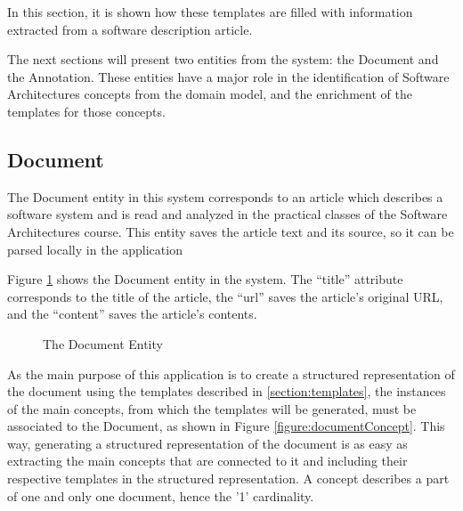 In this section, it is shown how these templates are filled with information extracted from a software description article.

The next sections will present two entities from the system: the Document and the Annotation. These entities have a major role in the identification of Software Architectures concepts from the domain model, and the enrichment of the templates for those concepts.

\subsection{Document}
\label{section:document}

The Document entity in this system corresponds to an article which describes a software system and is read and analyzed in the practical classes of the Software Architectures course. This entity saves the article text and its source, so it can be parsed locally in the application

Figure \ref{figure:documentEntity} shows the Document entity in the system. The ``title'' attribute corresponds to the title of the article, the ``url'' saves the article's original URL, and the ``content'' saves the article's contents.

\begin{figure}[h]
\centering
\renewcommand {\umltextcolor}{black}
\renewcommand {\umlfillcolor}{none}
\renewcommand {\umldrawcolor}{black}

\caption{The Document Entity}
\label{figure:documentEntity}
\end{figure}

As the main purpose of this application is to create a structured representation of the document using the templates described in \ref{section:templates}, the instances of the main concepts, from which the templates will be generated, must be associated to the Document, as shown in Figure \ref{figure:documentConcept}. This way, generating a structured representation of the document is as easy as extracting the main concepts that are connected to it and including their respective templates in the structured representation. A concept describes a part of one and only one document, hence the '1' cardinality.  

